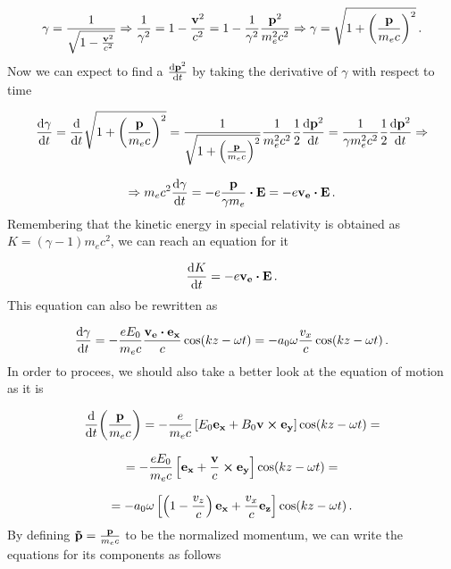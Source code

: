 \documentclass[12pt, class=report, crop=false]{standalone}
\begin{document}
\begin{equation*}
  \gamma = \frac{1}{\sqrt{1 - \frac{\vb{v}^2}{c^2}}} \Rightarrow
  \frac{1}{\gamma^2} = 1 - \frac{\vb{v}^2}{c^2} = 1 - \frac{1}{\gamma^2} \frac{\vb{p}^2}{m_e^2 c^2} \Rightarrow \gamma = \sqrt{1+\left(\frac{\vb{p}}{m_e c}\right)^2} \,.
\end{equation*}
Now we can expect to find a \(\dv{\vb{p}^2}{t}\) by taking the derivative of \(\gamma\) with respect to time

\begin{equation*}
  \dv{\gamma}{t} = \dv{t} \sqrt{1+\left(\frac{\vb{p}}{m_e c}\right)^2} = \frac{1}{\sqrt{1+\left(\frac{\vb{p}}{m_e c}\right)^2} } \frac{1}{m_e^2 c^2} \frac{1}{2} \dv{\vb{p}^2}{t} = \frac{1}{\gamma m_e^2 c^2}\frac{1}{2} \dv{\vb{p}^2}{t} \Rightarrow
\end{equation*}

\begin{equation*}
  \Rightarrow m_e c^2 \dv{\gamma}{t} = - e \frac{\vb{p}}{\gamma m_e} \vdot \vb{E} = -e \vb{v_e}\vdot\vb{E}\,.
\end{equation*}
Remembering that the kinetic energy in special relativity is obtained as \(K = (\gamma - 1) m_e c^2\), we can reach an equation for it

\begin{equation}
  \dv{K}{t} = -e \vb{v_e}\vdot\vb{E}\,.
\end{equation}
This equation can also be rewritten as

\begin{equation}
  \label{eq:gamma-vx}
  \dv{\gamma}{t} = -\frac{e E_0}{m_e c} \frac{\vb{v_e}\vdot\vb{e_x}}{c} \cos(kz-\omega t) = - a_0 \omega \frac{v_x}{c} \cos(kz-\omega t)\,.
\end{equation}
In order to procees, we should also take a better look at the equation of motion as it is

\begin{equation*}
  \dv{t} (\frac{\vb{p}}{m_e c}) = - \frac{e}{m_e c} \left[E_0 \vb{e_x} + B_0 \vb{v}\cp\vb{e_y}\right]\cos(kz-\omega t) =
\end{equation*}

\begin{equation*}
  = - \frac{e E_0}{m_e c} \left[\vb{e_x} + \frac{\vb{v}}{c}\cp\vb{e_y} \right]\cos(kz-\omega t) =
\end{equation*}

\begin{equation*}
  = -a_0 \omega \left[ \left(1 - \frac{v_z}{c} \right)\vb{e_x} + \frac{v_x}{c} \vb{e_z} \right]\cos(kz-\omega t)\,.
\end{equation*}
By defining \(\vb{\tilde{p}} = \frac{\vb{p}}{m_e c}\) to be the normalized momentum, we can write the equations for its components as follows
\end{document}
